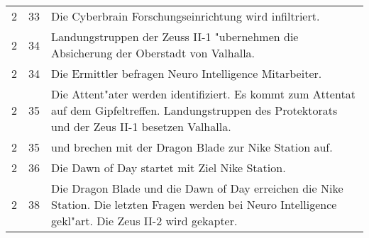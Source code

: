 \begin{boxedtext}
\begin{tabularx}{\textwidth}{r r X}
        2       &   33 & Die Cyberbrain Forschungseinrichtung wird infiltriert.\\
        2       &   34 & Landungstruppen der Zeuss II-1 "ubernehmen die Absicherung der Oberstadt von Valhalla.\\
        2       &   34 & Die Ermittler befragen Neuro Intelligence Mitarbeiter.\\
        2       &   35 & Die Attent"ater werden identifiziert. Es kommt zum Attentat auf dem Gipfeltreffen. Landungstruppen des 
                         Protektorats  und der Zeus II-1 besetzen Valhalla. \\
        2       &   35 & \xl{} und \ml{} brechen mit der Dragon Blade zur Nike Station auf.\\
        2       &   36 & Die Dawn of Day startet mit Ziel Nike Station.\\
        2       &   38 & Die Dragon Blade und die Dawn of Day erreichen die Nike Station. Die letzten Fragen werden bei Neuro Intelligence 
                         gekl"art. Die Zeus II-2 wird gekapter.\\
    \end{tabularx}
\end{boxedtext}
\renewcommand{\arraystretch}{1}
\pagebreak
